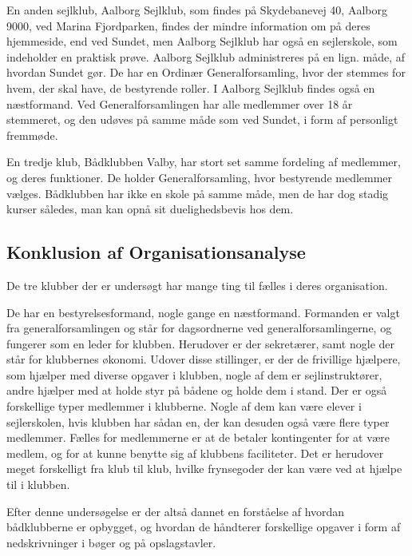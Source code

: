 En anden sejlklub, Aalborg Sejlklub, som findes på Skydebanevej 40, Aalborg 9000, ved Marina Fjordparken, findes der
mindre information om på deres hjemmeside, end ved Sundet, men Aalborg Sejlklub har også en sejlerskole, som indeholder en
praktisk prøve. Aalborg Sejlklub administreres på en lign. måde, af hvordan Sundet gør. De har en
Ordinær Generalforsamling, hvor der stemmes for hvem, der skal have, de bestyrende roller. I Aalborg Sejlklub findes også
en næstformand. Ved Generalforsamlingen har alle medlemmer over 18 år stemmeret, og den udøves på samme måde som ved
Sundet, i form af personligt fremmøde.\citep{AalborgSejlklub}

En tredje klub, Bådklubben Valby, har stort set samme fordeling af medlemmer, og deres funktioner. De holder
Generalforsamling, hvor bestyrende medlemmer vælges. Bådklubben har ikke en skole på samme måde, men de har dog stadig
kurser således, man kan opnå sit duelighedsbevis hos dem.\citep{BaadklubbenValby}


\subsection{Konklusion af Organisationsanalyse}

De tre klubber der er undersøgt har mange ting til fælles i deres organisation.

De har en bestyrelsesformand, nogle gange en næstformand. Formanden er valgt fra generalforsamlingen og står for
dagsordnerne ved generalforsamlingerne, og fungerer som en leder for klubben. Herudover er der sekretærer, samt nogle
der står for klubbernes økonomi. Udover disse stillinger, er der de frivillige hjælpere, som hjælper med diverse opgaver
i klubben, nogle af dem er sejlinstruktører, andre hjælper med at holde styr på bådene og holde dem i stand. Der er også
forskellige typer medlemmer i klubberne. Nogle af dem kan være elever i sejlerskolen, hvis klubben har sådan en, der kan
desuden også være flere typer medlemmer. Fælles for medlemmerne er at de betaler kontingenter for at være medlem, og for
at kunne benytte sig af klubbens faciliteter. Det er herudover meget forskelligt fra klub til klub, hvilke frynsegoder
der kan være ved at hjælpe til i klubben.

Efter denne undersøgelse er der altså dannet en forståelse af hvordan bådklubberne er opbygget, og hvordan de håndterer
forskellige opgaver i form af nedskrivninger i bøger og på opslagstavler.

